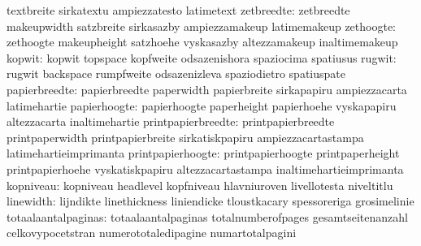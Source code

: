                                   textbreite                       sirkatextu
                                  ampiezzatesto                    latimetext
                      zetbreedte: zetbreedte                       makeupwidth
                                  satzbreite                       sirkasazby
                                  ampiezzamakeup                   latimemakeup %
                       zethoogte: zethoogte                        makeupheight
                                  satzhoehe                        vyskasazby
                                  altezzamakeup                    inaltimemakeup
                          kopwit: kopwit                           topspace
                                  kopfweite                        odsazenishora
                                  spaziocima                       spatiusus
                          rugwit: rugwit                           backspace
                                  rumpfweite                       odsazenizleva
                                  spaziodietro                     spatiuspate %
                   papierbreedte: papierbreedte                    paperwidth
                                  papierbreite                     sirkapapiru
                                  ampiezzacarta                    latimehartie
                    papierhoogte: papierhoogte                     paperheight
                                  papierhoehe                      vyskapapiru
                                  altezzacarta                     inaltimehartie
              printpapierbreedte: printpapierbreedte               printpaperwidth
                                  printpapierbreite                sirkatiskpapiru
                                  ampiezzacartastampa              latimehartieimprimanta %
               printpapierhoogte: printpapierhoogte                printpaperheight
                                  printpapierhoehe                 vyskatiskpapiru
                                  altezzacartastampa               inaltimehartieimprimanta  %
                       kopniveau: kopniveau                        headlevel
                                  kopfniveau                       hlavniuroven
                                  livellotesta                     niveltitlu %
                       linewidth: lijndikte                        linethickness
                                  liniendicke                      tloustkacary
                                  spessoreriga                     grosimelinie
             totaalaantalpaginas: totaalaantalpaginas              totalnumberofpages
                                  gesamtseitenanzahl               celkovypocetstran
                                  numerototaledipagine             numartotalpagini


